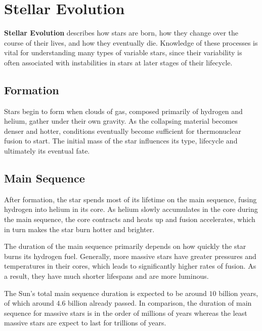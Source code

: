 \FloatBarrier


\section{Stellar Evolution}

\textbf{Stellar Evolution} describes how stars are born, how they change over the course of their lives, and how they eventually die.
Knowledge of these processes is vital for understanding many types of variable stars, since their variability is often associated with instabilities in stars at later stages of their lifecycle. \parencite{Aguirre2017}

\subsection{Formation}

Stars begin to form when clouds of gas, composed primarily of hydrogen and helium, gather under their own gravity.
As the collapsing material becomes denser and hotter, conditions eventually become sufficient for thermonuclear fusion to start.
The initial mass of the star influences its type, lifecycle and ultimately its eventual fate. \parencite{Girichidis2020}

\subsection{Main Sequence}

After formation, the star spends most of its lifetime on the main sequence, fusing hydrogen into helium in its core.
As helium slowly accumulates in the core during the main sequence, the core contracts and heats up and fusion accelerates, which in turn makes the star burn hotter and brighter. \parencite{Schonberg1942}

The duration of the main sequence primarily depends on how quickly the star burns its hydrogen fuel.
Generally, more massive stars have greater pressures and temperatures in their cores, which leads to significantly higher rates of fusion.
As a result, they have much shorter lifespans and are more luminous. \parencite{Schonberg1942}

The Sun's total main sequence duration is expected to be around $10$ billion years, of which around $4.6$ billion already passed.
In comparison, the duration of main sequence for massive stars is in the order of millions of years whereas the least massive stars are expect to last for trillions of years. \parencite{Laughlin1997}

